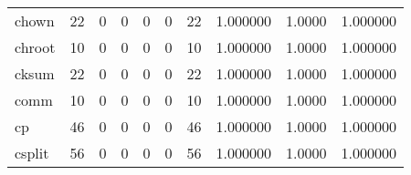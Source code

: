 \begin{tabular}{lrrrrrrrrr}
chown     &                                       22 &                                                  0 &                                                  0 &                                                  0 &                                                  0 &                                                 22 &                                           1.000000 &                                 1.0000 &                             1.000000 \\
chroot    &                                       10 &                                                  0 &                                                  0 &                                                  0 &                                                  0 &                                                 10 &                                           1.000000 &                                 1.0000 &                             1.000000 \\
cksum     &                                       22 &                                                  0 &                                                  0 &                                                  0 &                                                  0 &                                                 22 &                                           1.000000 &                                 1.0000 &                             1.000000 \\
comm      &                                       10 &                                                  0 &                                                  0 &                                                  0 &                                                  0 &                                                 10 &                                           1.000000 &                                 1.0000 &                             1.000000 \\
cp        &                                       46 &                                                  0 &                                                  0 &                                                  0 &                                                  0 &                                                 46 &                                           1.000000 &                                 1.0000 &                             1.000000 \\
csplit    &                                       56 &                                                  0 &                                                  0 &                                                  0 &                                                  0 &                                                 56 &                                           1.000000 &                                 1.0000 &                             1.000000 \\

\end{tabular}

